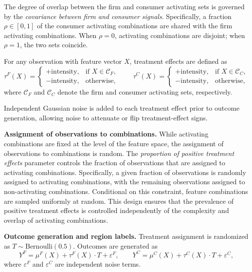 \documentclass[11pt,letterpaper,english]{article}
\theoremstyle{definition}
\theoremstyle{definition}
\begin{document}
\begin{bibunit}
The degree of overlap between the firm and consumer activating sets is governed by the \emph{covariance between firm and consumer signals}. Specifically, a fraction $\rho \in [0,1]$ of the consumer activating combinations are shared with the firm activating combinations. When $\rho = 0$, activating combinations are disjoint; when $\rho = 1$, the two sets coincide.

For any observation with feature vector $X$, treatment effects are defined as
\[
\tau^F(X) =
\begin{cases}
+\text{intensity}, & \text{if } X \in \mathcal{C}_F, \\
-\text{intensity}, & \text{otherwise},
\end{cases}
\qquad
\tau^C(X) =
\begin{cases}
+\text{intensity}, & \text{if } X \in \mathcal{C}_C, \\
-\text{intensity}, & \text{otherwise},
\end{cases}
\]
where $\mathcal{C}_F$ and $\mathcal{C}_C$ denote the firm and consumer activating sets, respectively.

Independent Gaussian noise is added to each treatment effect prior to outcome generation, allowing noise to attenuate or flip treatment-effect signs.

\vspace{6pt}
\noindent
\textbf{Assignment of observations to combinations.}
While activating combinations are fixed at the level of the feature space, the assignment of observations to combinations is random. The \emph{proportion of positive treatment effects} parameter controls the fraction of observations that are assigned to activating combinations. Specifically, a given fraction of observations is randomly assigned to activating combinations, with the remaining observations assigned to non-activating combinations. Conditional on this constraint, feature combinations are sampled uniformly at random. This design ensures that the prevalence of positive treatment effects is controlled independently of the complexity and overlap of activating combinations.

\vspace{6pt}
\noindent
\textbf{Outcome generation and region labels.}
Treatment assignment is randomized as $T \sim \mathrm{Bernoulli}(0.5)$. Outcomes are generated as
\[
Y^F = \mu^F(X) + \tau^F(X)\cdot T + \varepsilon^F, \qquad
Y^C = \mu^C(X) + \tau^C(X)\cdot T + \varepsilon^C,
\]
where $\varepsilon^F$ and $\varepsilon^C$ are independent noise terms.


\end{bibunit}
\end{document}
